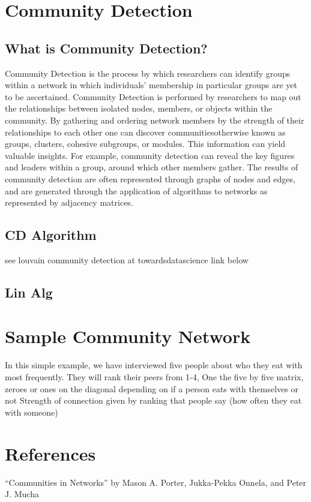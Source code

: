 \documentclass{article}
\begin{document}
\bigskip

\section{Community Detection}

\subsection{What is Community Detection?}

Community Detection is the process by which researchers can identify groups within a network in which individuals' membership in particular groups are yet to be ascertained. 
Community Detection is performed by researchers to map out the relationships between isolated nodes, members, or objects within the community. 
By gathering and ordering network members by the strength of their relationships to each other one can discover communities\textemdash otherwise known as groups, clusters, cohesive subgroups, or modules. 
This information can yield valuable insights. For example, community detection can reveal the key figures and leaders within a group, around which other members gather.
The results of community detection are often represented through graphs of nodes and edges, and are generated through the application of algorithms to networks as represented by adjacency matrices.

\subsection{CD Algorithm}
see louvain community detection at towardsdatascience link below

\subsection{Lin Alg}

\section{Sample Community Network}
In this simple example, we have interviewed five people about who they eat with most frequently. They will rank their peers from 1-4, 
One the five by five matrix, zeroes or ones on the diagonal depending on if a person eats with themselves or not
Strength of connection given by ranking that people say (how often they eat with someone)

\section*{References}
“Communities in Networks” by Mason A. Porter, Jukka-Pekka Onnela, and Peter J. Mucha
\end{document}
